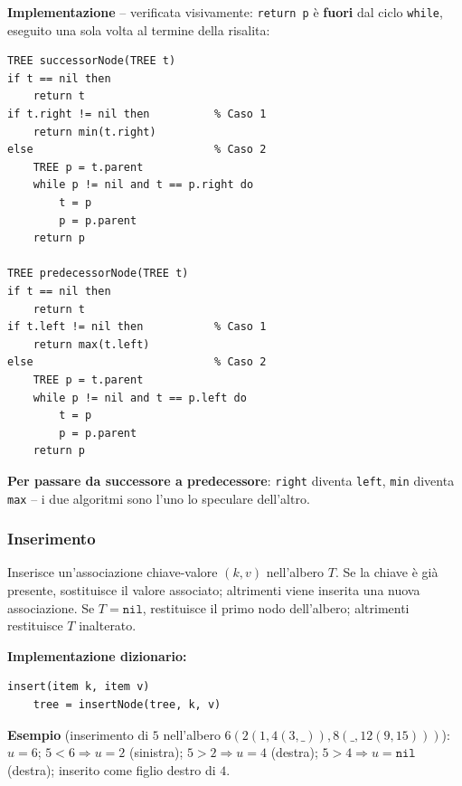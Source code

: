 \documentclass[12pt, a4paper]{article}
\begin{document}
\textbf{Implementazione} -- verificata visivamente: \texttt{return p} è \textbf{fuori} dal ciclo \texttt{while}, eseguito una sola volta al termine della risalita:
\begin{verbatim}
TREE successorNode(TREE t)
if t == nil then
    return t
if t.right != nil then          % Caso 1
    return min(t.right)
else                            % Caso 2
    TREE p = t.parent
    while p != nil and t == p.right do
        t = p
        p = p.parent
    return p

TREE predecessorNode(TREE t)
if t == nil then
    return t
if t.left != nil then           % Caso 1
    return max(t.left)
else                            % Caso 2
    TREE p = t.parent
    while p != nil and t == p.left do
        t = p
        p = p.parent
    return p
\end{verbatim}
\textbf{Per passare da successore a predecessore}: \texttt{right} diventa \texttt{left}, \texttt{min} diventa \texttt{max} -- i due algoritmi sono l'uno lo speculare dell'altro.

\subsubsection{Inserimento}

\begin{tcolorbox}[colback=lightergray!5, colframe=tocsubsec, title=\textbf{\texttt{insertNode()}}]
Inserisce un'associazione chiave-valore $(k,v)$ nell'albero $T$. Se la chiave è già presente, sostituisce il valore associato; altrimenti viene inserita una nuova associazione. Se $T=\texttt{nil}$, restituisce il primo nodo dell'albero; altrimenti restituisce $T$ inalterato.
\end{tcolorbox}

\textbf{Implementazione dizionario:}
\begin{verbatim}
insert(item k, item v)
    tree = insertNode(tree, k, v)
\end{verbatim}

\textbf{Esempio} (inserimento di $5$ nell'albero $6(2(1,4(3,\_)),8(\_,12(9,15)))$): $u=6$; $5<6\Rightarrow u=2$ (sinistra); $5>2\Rightarrow u=4$ (destra); $5>4\Rightarrow u=\texttt{nil}$ (destra); inserito come figlio destro di $4$.
\end{document}
